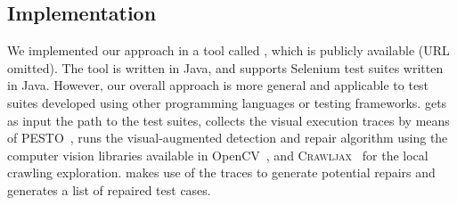 \subsection{Implementation}\label{sec:implementation}

We implemented our approach in a tool called \tool, which is publicly available (URL omitted). 
The tool is written in Java, and supports Selenium test suites written in Java. However, our overall approach is more general and applicable to test suites developed using other programming languages or testing frameworks. 
\tool gets as input the path to the test suites, collects the visual execution traces by means of \textsc{PESTO}~\cite{2014-Stocco-SCAM}, runs the visual-augmented detection and repair algorithm using the computer vision libraries available in OpenCV~\cite{opencv}, and \textsc{Crawljax}~\cite{mesbah:tweb12,mesbah:tse12} for the local crawling exploration. 
\tool makes use of the traces to generate potential repairs and generates a list of repaired test cases.







